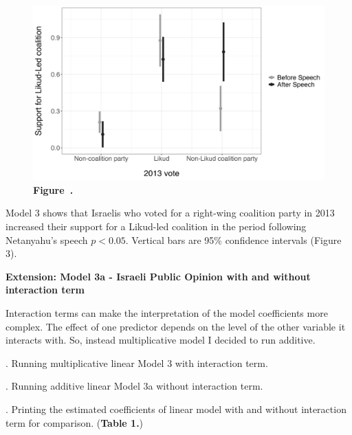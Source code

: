 \documentclass[12pt,letterpaper]{article}
\begin{document}
	\begin{figure}[H]
		\centering
		\includegraphics[width=1.0\textwidth]{figures_rep/Figure3.png}
		\label{fig:your_figure_label} 
		\textbf{Figure~\thefigure.}
		\label{fig:figure3}
	\end{figure}
	
Model 3 shows that Israelis who voted for a right-wing coalition party in 2013 increased their support for a Likud-led coalition in the period following Netanyahu’s speech \(p < 0.05\). Vertical bars are 95\% confidence intervals (Figure 3).
	
\begin{center}
	\noindent \textbf{Extension: Model 3a - Israeli Public Opinion with and without interaction term}
\end{center}

Interaction terms can make the interpretation of the model coefficients more complex. The effect of one predictor depends on the level of the other variable it interacts with. So, instead multiplicative model I decided to run additive.

	\vspace{0.2cm}
	. Running multiplicative linear Model 3 with interaction term. 
	 

	\vspace{0.2cm}
. Running additive linear Model 3a without interaction term. 
 
		\vspace{0.2cm}

. Printing the estimated coefficients of linear model with and without interaction term for comparison. (\textbf{Table 1.})
 
	\vspace{0.2cm}
	
\end{document}
